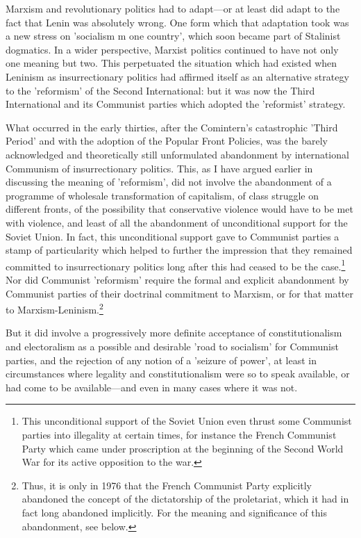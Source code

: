 Marxism and revolutionary politics had to adapt—or at least did adapt to the fact that Lenin was absolutely wrong. One form which that adaptation took was a new stress on 'socialism m one country', which soon became part of Stalinist dogmatics. In a wider perspective, Marxist politics continued to have not only one meaning but two. This perpetuated the situation which had existed when Leninism as insurrectionary politics had affirmed itself as an alternative strategy to the 'reformism' of the Second International: but it was now the Third International and its Communist parties which adopted the 'reformist' strategy.

What occurred in the early thirties, after the Comintern's catastrophic 'Third Period' and with the adoption of the Popular Front Policies, was the barely acknowledged and theoretically still unformulated abandonment by international Communism of insurrectionary politics. This, as I have argued earlier in discussing the meaning of 'reformism', did not involve the abandonment of a programme of wholesale transformation of capitalism, of class struggle on different fronts, of the possibility  that conservative violence would have to be met with violence, and least of all the abandonment of unconditional support for the Soviet Union. In fact, this unconditional support gave to Communist parties a stamp of particularity which helped to further the impression that they remained committed to insurrectionary politics long after this had ceased to be the case.\footnote{This unconditional support of the Soviet Union even thrust some Communist parties into illegality at certain times, for instance the French Communist Party which came under proscription at the beginning of the Second World War for its active opposition to the war.} Nor did Communist 'reformism' require the formal and explicit abandonment by Communist parties of their doctrinal commitment to Marxism, or for that matter to Marxism-Leninism.\footnote{Thus, it is only in 1976 that the French Communist Party explicitly abandoned the concept of the dictatorship of the proletariat, which it had in fact long abandoned implicitly. For the meaning and significance of this abandonment, see below.}
 
But it did involve a progressively more definite acceptance of constitutionalism and electoralism as a possible and desirable 'road to socialism' for Communist parties, and the rejection of any notion of a 'seizure of power', at least in circumstances where legality and constitutionalism were so to speak available, or had come to be available—and even in many cases where it was not.

